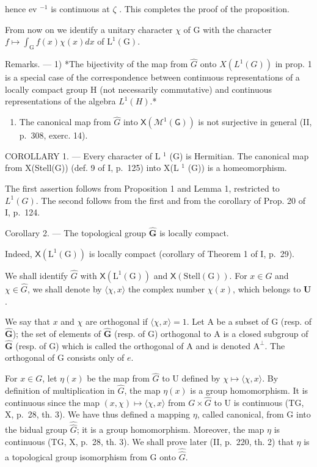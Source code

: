 hence ev \(^{-1}\) is continuous at \(\zeta\) . This completes the proof of the proposition.

From now on we identify a unitary character \(\chi\) of G with the character \(f\mapsto\int_{\mathrm{G}}f(x)\chi(x)dx\) of \(\mathrm{L}^{1}(\mathrm{G})\).

Remarks. --- 1) *The bijectivity of the map from \(\widehat{G}\) onto \(X(L^{1}(G))\) in prop. 1 is a special case of the correspondence between continuous representations of a locally compact group H (not necessarily commutative) and continuous representations of the algebra \(L^{1}(H)\).*

\begin{enumerate}
\def\labelenumi{\arabic{enumi})}
\setcounter{enumi}{1}
\tightlist
\item
  The canonical map from \(\widehat{G}\) into \(\mathsf{X}(\mathcal{M}^{1}(\mathsf{G}))\) is not surjective in general (II, p.~308, exerc. 14).
\end{enumerate}

COROLLARY 1. --- Every character of L \(^{1}\) (G) is Hermitian. The canonical map from X(Stell(G)) (def. 9 of I, p.~125) into X(L \(^{1}\) (G)) is a homeomorphism.

The first assertion follows from Proposition 1 and Lemma 1, restricted to \(L^{1}(G)\). The second follows from the first and from the corollary of Prop. 20 of I, p.~124.

Corollary 2. --- The topological group \(\widehat{\mathbf{G}}\) is locally compact.

Indeed, \(\mathsf{X}(\mathrm{L}^{1}(\mathrm{G}))\) is locally compact (corollary of Theorem 1 of I, p.~29).

We shall identify \(\widehat{G}\) with \(\mathsf{X}(\mathrm{L}^1 (\mathrm{G}))\) and \(\mathsf{X}(\mathrm{Stell}(\mathrm{G}))\). For \(x\in G\) and \(\chi \in \widehat{G}\), we shall denote by \(\langle \chi ,x\rangle\) the complex number \(\chi (x)\), which belongs to \(\mathbf{U}\).

We say that \(x\) and \(\chi\) are orthogonal if \(\langle \chi, x \rangle = 1\). Let A be a subset of G (resp. of \(\widehat{\mathbf{G}}\)); the set of elements of \(\widehat{\mathbf{G}}\) (resp. of G) orthogonal to A is a closed subgroup of \(\widehat{\mathbf{G}}\) (resp. of G) which is called the orthogonal of A and is denoted \(\mathrm{A}^{\perp}\). The orthogonal of G consists only of \(e\).

For \(x \in G\), let \(\eta(x)\) be the map from \(\widehat{G}\) to U defined by \(\chi \mapsto \langle \chi, x \rangle\). By definition of multiplication in \(\widehat{G}\), the map \(\eta(x)\) is a group homomorphism. It is continuous since the map \((x, \chi) \mapsto \langle \chi, x \rangle\) from \(G \times \widehat{G}\) to U is continuous (TG, X, p.~28, th. 3). We have thus defined a mapping \(\eta\), called canonical, from G into the bidual group \(\widehat{\widehat{G}}\); it is a group homomorphism. Moreover, the map \(\eta\) is continuous (TG, X, p.~28, th. 3). We shall prove later (II, p.~220, th. 2) that \(\eta\) is a topological group isomorphism from G onto \(\widehat{\widehat{G}}\).

